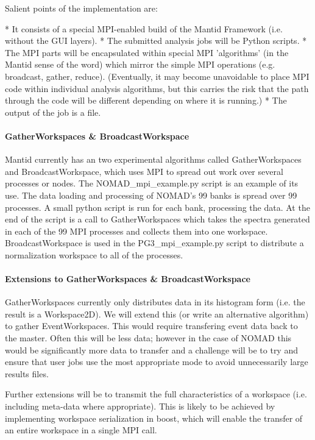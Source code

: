 Salient points of the implementation are:

* It consists of a special MPI-enabled build of the Mantid Framework (i.e. without the GUI layers).
* The submitted analysis jobs will be Python scripts.
* The MPI parts will be encapsulated within special MPI 'algorithms' (in the Mantid sense of the word) which mirror the simple MPI operations (e.g. broadcast, gather, reduce). (Eventually, it may become unavoidable to place MPI code within individual analysis algorithms, but this carries the risk that the path through the code will be different depending on where it is running.)
* The output of the job is a file.

\paragraph{GatherWorkspaces & BroadcastWorkspace}

Mantid currently has an two experimental algorithms called GatherWorkspaces and BroadcastWorkspace, which uses MPI to spread out work over several processes or nodes. The NOMAD\_mpi\_example.py script is an example of its use. The data loading and processing of NOMAD's 99 banks is spread over 99 processes. A small python script is run for each bank, processing the data. At the end of the script is a call to GatherWorkspaces which takes the spectra generated in each of the 99 MPI processes and collects them into one workspace. BroadcastWorkspace is used in the PG3\_mpi\_example.py script to distribute a normalization workspace to all of the processes.

\paragraph{Extensions to GatherWorkspaces & BroadcastWorkspace}

GatherWorkspaces currently only distributes data in its histogram form (i.e. the result is a Workspace2D). We will extend this (or write an alternative algorithm) to gather EventWorkspaces. This would require transfering event data back to the master. Often this will be less data; however in the case of NOMAD this would be significantly more data to transfer and a challenge will be to try and ensure that user jobs use the most appropriate mode to avoid unnecessarily large results files.

Further extensions will be to transmit the full characteristics of a workspace (i.e. including meta-data where appropriate). This is likely to be achieved by implementing workspace serialization in boost, which will enable the transfer of an entire workspace in a single MPI call.

